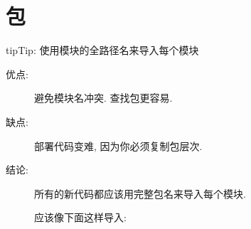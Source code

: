 \documentclass[a4paper,10pt,english]{sphinxmanual}
\begin{document}
\section{包}
\label{\detokenize{python_language_rules:id2}}
\begin{sphinxadmonition}{tip}{Tip:}
使用模块的全路径名来导入每个模块
\end{sphinxadmonition}
\begin{description}
\item[{优点:}] \leavevmode
避免模块名冲突. 查找包更容易.

\item[{缺点:}] \leavevmode
部署代码变难, 因为你必须复制包层次.

\item[{结论:}] \leavevmode
所有的新代码都应该用完整包名来导入每个模块.

应该像下面这样导入:

%
\begin{sphinxVerbatim}[commandchars=\\\{\}]
 

   
\end{sphinxVerbatim}

\end{description}
\end{document}
